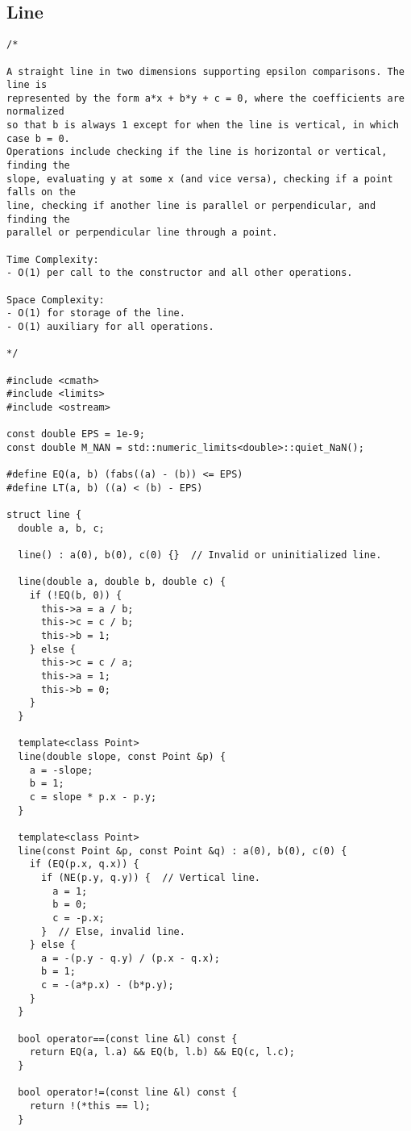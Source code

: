 \subsection{Line}
\begin{lstlisting}
/*

A straight line in two dimensions supporting epsilon comparisons. The line is
represented by the form a*x + b*y + c = 0, where the coefficients are normalized
so that b is always 1 except for when the line is vertical, in which case b = 0.
Operations include checking if the line is horizontal or vertical, finding the
slope, evaluating y at some x (and vice versa), checking if a point falls on the
line, checking if another line is parallel or perpendicular, and finding the
parallel or perpendicular line through a point.

Time Complexity:
- O(1) per call to the constructor and all other operations.

Space Complexity:
- O(1) for storage of the line.
- O(1) auxiliary for all operations.

*/

#include <cmath>
#include <limits>
#include <ostream>

const double EPS = 1e-9;
const double M_NAN = std::numeric_limits<double>::quiet_NaN();

#define EQ(a, b) (fabs((a) - (b)) <= EPS)
#define LT(a, b) ((a) < (b) - EPS)

struct line {
  double a, b, c;

  line() : a(0), b(0), c(0) {}  // Invalid or uninitialized line.

  line(double a, double b, double c) {
    if (!EQ(b, 0)) {
      this->a = a / b;
      this->c = c / b;
      this->b = 1;
    } else {
      this->c = c / a;
      this->a = 1;
      this->b = 0;
    }
  }

  template<class Point>
  line(double slope, const Point &p) {
    a = -slope;
    b = 1;
    c = slope * p.x - p.y;
  }

  template<class Point>
  line(const Point &p, const Point &q) : a(0), b(0), c(0) {
    if (EQ(p.x, q.x)) {
      if (NE(p.y, q.y)) {  // Vertical line.
        a = 1;
        b = 0;
        c = -p.x;
      }  // Else, invalid line.
    } else {
      a = -(p.y - q.y) / (p.x - q.x);
      b = 1;
      c = -(a*p.x) - (b*p.y);
    }
  }

  bool operator==(const line &l) const {
    return EQ(a, l.a) && EQ(b, l.b) && EQ(c, l.c);
  }

  bool operator!=(const line &l) const {
    return !(*this == l);
  }


\end{lstlisting}
